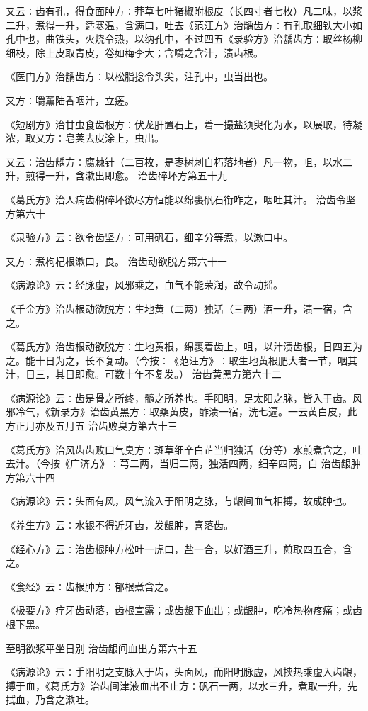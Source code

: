 \documentclass[a4paper,12pt,UTF8,twoside]{ctexbook}
\begin{document}
又云∶齿有孔，得食面肿方∶莽草七叶猪椒附根皮（长四寸者七枚）凡二味，以浆二升，煮得一升，适寒温，含满口，吐去《范汪方》治龋齿方∶有孔取细铁大小如孔中也，曲铁头，火烧令热，以纳孔中，不过四五《录验方》治龋齿方∶取丝杨柳细枝，除上皮取青皮，卷如梅李大；含嚼之含汁，渍齿根。

《医门方》治龋齿方∶以松脂捻令头尖，注孔中，虫当出也。

又方∶嚼薰陆香咽汁，立瘥。

《短剧方》治甘虫食齿根方∶伏龙肝置石上，着一撮盐须臾化为水，以展取，待凝浓，取又方∶皂荚去皮涂上，虫出。

又云∶治齿龋方∶腐棘针（二百枚，是枣树刺自朽落地者）凡一物，咀，以水二升，煎得一升，含漱出即愈。
治齿碎坏方第五十九

《葛氏方》治人病齿稍碎坏欲尽方恒能以绵裹矾石衔咋之，咽吐其汁。
治齿令坚方第六十

《录验方》云∶欲令齿坚方∶可用矾石，细辛分等煮，以漱口中。

又方∶煮枸杞根漱口，良。
治齿动欲脱方第六十一

《病源论》云∶经脉虚，风邪乘之，血气不能荣润，故令动摇。

《千金方》治齿根动欲脱方∶生地黄（二两）独活（三两）酒一升，渍一宿，含之。

《葛氏方》治齿根动欲脱方∶生地黄根，绵裹着齿上，咀，以汁渍齿根，日四五为之。能十日为之，长不复动。（今按∶《范汪方》∶取生地黄根肥大者一节，咽其汁，日三，其日即愈。可数十年不复发。）
治齿黄黑方第六十二

《病源论》云∶齿是骨之所终，髓之所养也。手阳明，足太阳之脉，皆入于齿。风邪冷气，《新录方》治齿黄黑方∶取桑黄皮，酢渍一宿，洗七遍。一云黄白皮，此方正月亦及五月五
治齿败臭方第六十三

《葛氏方》治风齿齿败口气臭方∶斑草细辛白芷当归独活（分等）水煎煮含之，吐去汁。（今按《广济方》∶芎二两，当归二两，独活四两，细辛四两，白
治齿龈肿方第六十四

《病源论》云∶头面有风，风气流入于阳明之脉，与龈间血气相搏，故成肿也。

《养生方》云∶水银不得近牙齿，发龈肿，喜落齿。

《经心方》云∶治齿根肿方松叶一虎口，盐一合，以好酒三升，煎取四五合，含之。

《食经》云∶齿根肿方∶郁根煮含之。

《极要方》疗牙齿动落，齿根宣露；或齿龈下血出；或龈肿，吃冷热物疼痛；或齿根下黑。

至明欲浆平坐日别
治齿龈间血出方第六十五

《病源论》云∶手阳明之支脉入于齿，头面风，而阳明脉虚，风挟热乘虚入齿龈，搏于血，《葛氏方》治齿间津液血出不止方∶矾石一两，以水三升，煮取一升，先拭血，乃含之漱吐。
\end{document}
